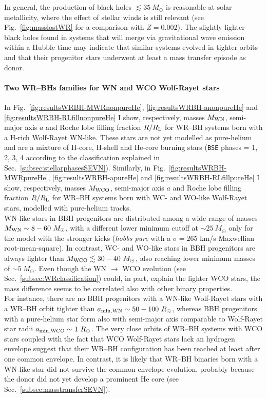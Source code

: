 \documentclass[a4paper,titlepage]{book}     	%
\newcommand{\sun}{\ensuremath{_\odot}}
\newcommand{\msun}{\ensuremath{M\sun}}
\newcommand{\rsun}{R_{\odot}}
\begin{document}
In general, the production of black holes $\lesssim 35~\msun$ is reasonable at solar metallicity, where the effect of stellar winds is still relevant (see Fig.\ \ref{fig:masslostWR} for a comparison with $Z=0.002$). The slightly lighter black holes found in systems that will merge via gravitational wave emission within a Hubble time may indicate that similar systems evolved in tighter orbits and that their progenitor stars underwent at least a mass transfer episode as donor.

\paragraph{Two WR--BHs families for WN and WCO Wolf-Rayet stars} In Fig.\ \ref{fig:resultsWRBH-MWRnonpureHe}, \ref{fig:resultsWRBH-anonpureHe} and \ref{fig:resultsWRBH-RLfillnonpureHe} I show, respectively, masses $M_{\rm WN}$, semi-major axis $a$ and Roche lobe filling fraction $R/R_{\rm L}$ for WR--BH systems born with a H-rich Wolf-Rayet WN-like. These stars are not yet modelled as pure-helium and are a mixture of H-core, H-shell and He-core burning stars (\texttt{BSE} phases = 1, 2, 3, 4 according to the classification explained in Sec.\ \ref{subsec:stellarphasesSEVN}). Similarly, in Fig.\ \ref{fig:resultsWRBH-MWRpureHe}, \ref{fig:resultsWRBH-apureHe} and \ref{fig:resultsWRBH-RLfillpureHe} I show, respectively, masses $M_{\rm WCO}$, semi-major axis $a$ and Roche lobe filling fraction $R/R_{\rm L}$ for WR--BH systems born with WC- and WO-like Wolf-Rayet stars, modelled with pure-helium tracks.\\



WN-like stars in BBH progenitors are distributed among a wide range of masses $M_{\rm WN} \sim 8-60~\msun$, with a different lower minimum cutoff at $\sim 25~\msun$ only for the model with the stronger kicks (\emph{hobbs pure} with a $\sigma=265$ km/s Maxwellian root-mean-square). In contrast, WC- and WO-like stars in BBH progenitors are always lighter than $M_{\rm WCO} \lesssim 30-40~\msun$, also reaching lower minimum masses of $\sim 5~\msun$. Even though the WN $\rightarrow$ WCO evolution (see Sec.\ \ref{subsec:WRclassification}) could, in part, explain the lighter WCO stars, the mass difference seems to be correlated also with other binary properties.\\

For instance, there are no BBH progenitors with a WN-like Wolf-Rayet stars with a WR--BH orbit tighter than $a_{\rm min, WN} \sim 50-100~\rsun$, whereas BBH progenitors with a pure-helium star form also with semi-major axis comparable to Wolf-Rayet star radii $a_{\rm min, WCO} \sim 1~\rsun$. The very close orbits of WR--BH systems with WCO stars coupled with the fact that WCO Wolf-Rayet stars lack an hydrogen envelope suggest that their WR--BH configuration has been reached at least after one common envelope. In contrast, it is likely that WR--BH binaries born with a WN-like star did not survive the common envelope evolution, probably because the donor did not yet develop a prominent He core (see Sec.\ \ref{subsec:masstransferSEVN}).\\
\end{document}
